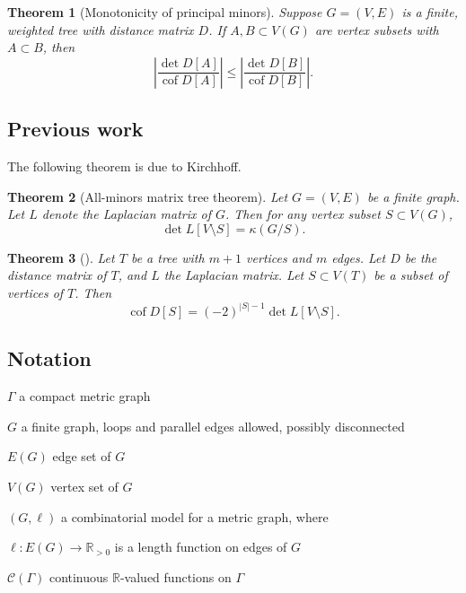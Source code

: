 \documentclass{amsart}
\newtheorem{thm}{Theorem}
\theoremstyle{definition}
\newcommand{\RR}{\mathbb{R}}
\newcommand{\cC}{\mathcal{C}}
\DeclareMathOperator{\cof}{cof}
\begin{document}
\begin{thm}[Monotonicity of principal minors]
Suppose $G = (V,E)$ is a finite, weighted tree with distance matrix $D$.
If $A,B \subset V(G)$
are vertex subsets with
$A \subset B$,
then
\begin{equation*}
\left| \frac{\det D[A]}{\cof D[A]} \right| \leq \left| \frac{\det D[B]}{\cof D[B]} \right| .
\end{equation*}
\end{thm}

\subsection{Previous work} 

The following theorem is due to Kirchhoff.

\begin{thm}[All-minors matrix tree theorem]
Let $G = (V,E)$ be a finite graph.
Let $L$ denote the Laplacian matrix of $G$.
Then for any vertex subset $S \subset V(G)$,
\begin{equation}
\det L[V \setminus S] = \kappa( G / S) .
\end{equation}
\end{thm}


\begin{thm}[\cite{bapat-sivasubramanian}]
Let $T$ be a tree with $m+1$ vertices and $m$ edges.
Let $D$ be the distance matrix of $T$, and $L$ the Laplacian matrix.
Let $S \subset V(T)$ be a subset of vertices of $T$. 
Then
\begin{equation*}
\cof D[S] = (-2)^{|S|-1} \det L[V \setminus S] .
\end{equation*}
\end{thm}

\subsection{Notation}

$\Gamma$ a compact metric graph

$G$ a finite graph, 
loops and parallel edges allowed,
possibly disconnected

$E(G)$ edge set of $G$

$V(G)$ vertex set of $G$

$(G,\ell)$ a combinatorial model for a metric graph,
where 

$\ell : E(G) \to \RR_{>0}$
is a length function on edges of $G$

$\cC(\Gamma)$ continuous $\RR$-valued functions on $\Gamma$
\end{document}
